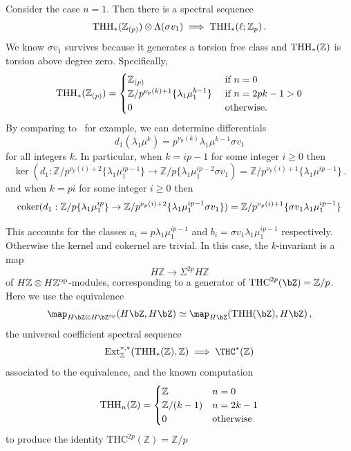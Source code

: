 \begin{example}
Consider the case $n=1$. Then there is a spectral sequence 
\[ 
\operatorname{THH}_{*}(\mathbb{Z}_{(p)})\otimes \Lambda (\sigma v_{1})\implies \operatorname{THH}_{*}(\ell;\mathbb{Z}_{p}) \,.
\]
We know $\sigma v_1$ survives because it generates a torsion free class and $\operatorname{THH}_*(\mathbb{Z})$ is torsion above degree zero. Specifically, 
\[
\operatorname{THH}_*(\mathbb{Z}_{(p)})=\begin{cases} \mathbb{Z}_{(p)} & \text{ if } n=0 \\ 
\mathbb{Z}/p^{\nu_p(k)+1}\{\lambda_1\mu_1^{k-1}\} & \text{ if } n=2pk-1>0 \\ 
0 & \text{ otherwise.}
\end{cases}
\]
By comparing to~\cite{AHL10} for example, we can determine differentials 
\[
d_1(\lambda_1\mu^{k})\dot{=}p^{\nu_p(k)}\lambda_1\mu^{k-1}\sigma v_1 
\]
for all integers $k$. 
In particular, when $k=ip-1$ for some integer $i\ge 0$ then 
\[ 
\ker
(d_1 :\mathbb{Z}/p^{\nu_p(i)+2}\{\lambda_1\mu_1^{ip-1}\}\to \mathbb{Z}/p\{\lambda_1\mu_1^{ip-2}\sigma v_1) = \mathbb{Z}/p^{\nu_p(i)+1}\{\lambda_1\mu^{ip-1}\} \,.
\]
and when $k=pi$ for some integer $i\ge 0$ then 
\[ 
\textup{coker} 
(d_1 :\mathbb{Z}/p\{\lambda_1\mu_1^{ip}\}\to \mathbb{Z}/p^{\nu_p(i)+2}\{\lambda_1 \mu_1^{ip-1}\sigma v_1 \}) = \mathbb{Z}/p^{\nu_p(i)+1}\{\sigma v_1\lambda_1\mu_1^{ip-1}\}
\]

This accounts for the classes $a_i=p\lambda_1\mu_1^{ip-1}$ and $b_i=\sigma v_1\lambda_1\mu_1^{ip-1}$ respectively. Otherwise the kernel and cokernel are trivial. In this case, the $k$-invariant is a map 
\[ H\mathbb{Z}\to \Sigma^{2p} H\mathbb{Z}\]
of $ H\mathbb{Z}\otimes H\mathbb{Z}^{\mathrm{op}}$-modules, corresponding to a generator of $\mathrm{THC}^{2p}(\bZ)=\mathbb{Z}/p$. Here we use the equivalence 
\[ 
\map_{H\bZ\otimes H\bZ^{\op}}(H\bZ,H\bZ)\simeq \map_{H\bZ}(\THH(\bZ),H\bZ) \,,
\]
the universal coefficient spectral sequence 
\[ 
\Ext_{\mathbb{Z}}^{*,*}(\THH_*(\mathbb{Z}),\mathbb{Z})\implies \THC^*(\mathbb{Z})
\]
associated to the equivalence, and the known computation 
\[
    \operatorname{THH}_n(\mathbb{Z})=\begin{cases} \mathbb{Z} &n=0 \\ 
    \mathbb{Z}/(k-1) &n=2k-1 \\ 
    0 & \text{otherwise}
    \end{cases}
\]
to produce the identity $\mathrm{THC}^{2p}(\mathbb{Z})=\mathbb{Z}/p$
\end{example}
